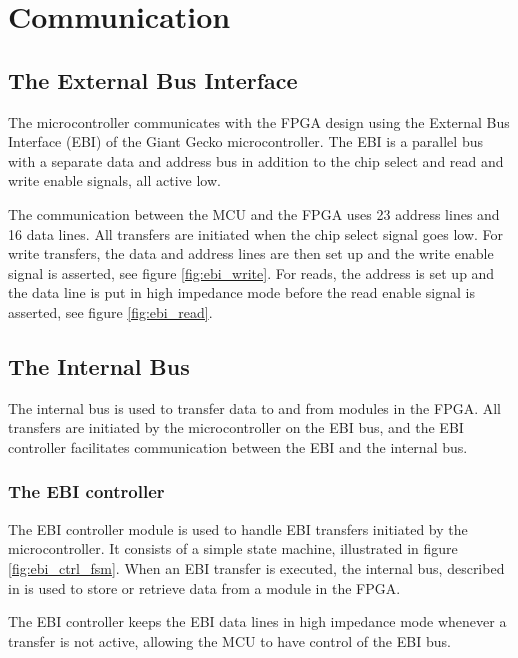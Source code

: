 \FloatBarrier
\section{Communication}\label{section:fpga-buses}

\subsection{The External Bus Interface}
The microcontroller communicates with the FPGA design using the External Bus
Interface (EBI) of the Giant Gecko microcontroller. The EBI is a parallel bus
with a separate data and address bus in addition to the chip select and read and
write enable signals, all active low\cite{efm_ebi}.

The communication between the MCU and the FPGA uses 23 address lines and 16
data lines. All transfers are initiated when the chip select signal goes low.
For write transfers, the data and address lines are then set up and the
write enable signal is asserted, see figure \ref{fig:ebi_write}. For reads,
the address is set up and the data line is put in high impedance mode before
the read enable signal is asserted, see figure \ref{fig:ebi_read}.




\FloatBarrier
\subsection{The Internal Bus}

The internal bus is used to transfer data to and from modules in the FPGA.
All transfers are initiated by the microcontroller on the EBI bus, and the
EBI controller facilitates communication between the EBI and the
internal bus.

\subsubsection{The EBI controller}
The EBI controller module is used to handle EBI transfers initiated by the
microcontroller. It consists of a simple state machine, illustrated in
figure \ref{fig:ebi_ctrl_fsm}. When an EBI transfer is executed, the
internal bus, described in is used to store or retrieve data from a module
in the FPGA.

The EBI controller keeps the EBI data lines in high impedance mode whenever
a transfer is not active, allowing the MCU to have control of the EBI bus.

